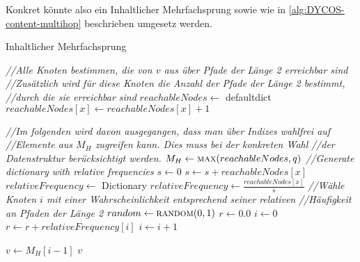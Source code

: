 Konkret könnte also ein Inhaltlicher Mehrfachsprung sowie wie in
\cref{alg:DYCOS-content-multihop} beschrieben umgesetz werden.

\begin{algorithm}
  \caption{Inhaltlicher Mehrfachsprung}
  \label{alg:DYCOS-content-multihop}
    \begin{algorithmic}[1]
            \State \textit{//Alle Knoten bestimmen, die von $v$ aus über Pfade der Länge 2 erreichbar sind}
            \State \textit{//Zusätzlich wird für diese Knoten die Anzahl der Pfade der Länge 2 bestimmt,}
            \State \textit{//durch die sie erreichbar sind}
            \State $reachableNodes \gets$ defaultdict
                    \State $reachableNodes[x] \gets reachableNodes[x] + 1$
                \EndFor
            \EndFor

            \State \textit{//Im folgenden wird davon ausgegangen, dass man über Indizes wahlfrei auf}
            \State \textit{//Elemente aus $M_H$ zugreifen kann. Dies muss bei der konkreten Wahl}
            \State \textit{//der Datenstruktur berücksichtigt werden.}
            \State $M_H \gets \Call{max}{reachableNodes, q}$ 
            \State \textit{//Generate dictionary with relative frequencies}
            \State $s \gets 0$
                \State $s \gets s + reachableNodes[x]$
            \EndFor
            \State $relativeFrequency \gets $ Dictionary
                \State $relativeFrequency \gets \frac{reachableNodes[x]}{s}$
            \EndFor
            \State \textit{//Wähle Knoten $i$ mit einer Wahrscheinlichkeit entsprechend seiner relativen}
            \State \textit{//Häufigkeit an Pfaden der Länge 2}
            \State $random \gets \Call{random}{0, 1}$
            \State $r \gets 0.0$
            \State $i \gets 0$
                \State $r \gets r + relativeFrequency[i]$
                \State $i \gets i + 1$
            \EndWhile
            
            \State $v \gets M_H[i-1]$ 
            \State \Return $v$
        \EndProcedure
    \end{algorithmic}
\end{algorithm}
